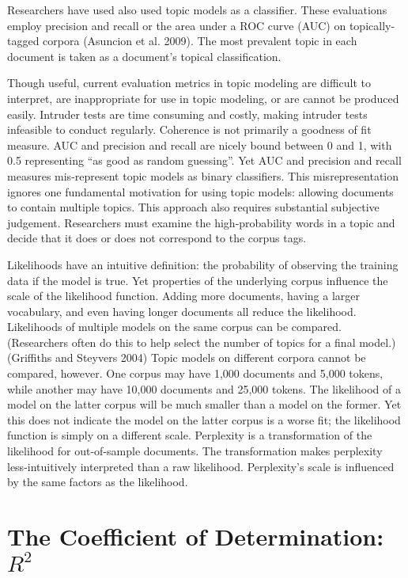 \documentclass[conference,final,]{IEEEtran}
\begin{document}
Researchers have used also used topic models as a classifier. These
evaluations employ precision and recall or the area under a ROC curve
(AUC) on topically-tagged corpora (Asuncion et al. 2009). The most
prevalent topic in each document is taken as a document's topical
classification.

Though useful, current evaluation metrics in topic modeling are
difficult to interpret, are inappropriate for use in topic modeling, or
are cannot be produced easily. Intruder tests are time consuming and
costly, making intruder tests infeasible to conduct regularly. Coherence
is not primarily a goodness of fit measure. AUC and precision and recall
are nicely bound between 0 and 1, with 0.5 representing ``as good as
random guessing''. Yet AUC and precision and recall measures
mis-represent topic models as binary classifiers. This misrepresentation
ignores one fundamental motivation for using topic models: allowing
documents to contain multiple topics. This approach also requires
substantial subjective judgement. Researchers must examine the
high-probability words in a topic and decide that it does or does not
correspond to the corpus tags.

Likelihoods have an intuitive definition: the probability of observing
the training data if the model is true. Yet properties of the underlying
corpus influence the scale of the likelihood function. Adding more
documents, having a larger vocabulary, and even having longer documents
all reduce the likelihood. Likelihoods of multiple models on the same
corpus can be compared. (Researchers often do this to help select the
number of topics for a final model.)(Griffiths and Steyvers 2004) Topic
models on different corpora cannot be compared, however. One corpus may
have 1,000 documents and 5,000 tokens, while another may have 10,000
documents and 25,000 tokens. The likelihood of a model on the latter
corpus will be much smaller than a model on the former. Yet this does
not indicate the model on the latter corpus is a worse fit; the
likelihood function is simply on a different scale. Perplexity is a
transformation of the likelihood for out-of-sample documents. The
transformation makes perplexity less-intuitively interpreted than a raw
likelihood. Perplexity's scale is influenced by the same factors as the
likelihood.

\hypertarget{the-coefficient-of-determination-r2}{%
\section{\texorpdfstring{The Coefficient of Determination:
\(R^2\)}{The Coefficient of Determination: R\^{}2}}\label{the-coefficient-of-determination-r2}}
\end{document}
